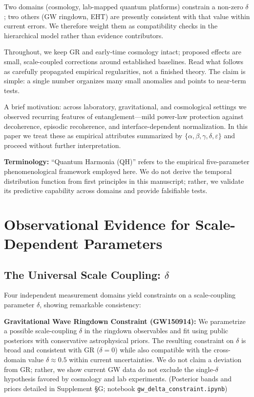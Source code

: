 Two domains (cosmology, lab-mapped quantum platforms) constrain a non-zero $\delta$; two others (GW ringdown, EHT) are presently consistent with that value within current errors. We therefore weight them as compatibility checks in the hierarchical model rather than evidence contributors.

Throughout, we keep GR and early-time cosmology intact; proposed effects are small, scale-coupled corrections around established baselines. Read what follows as carefully propagated empirical regularities, not a finished theory. The claim is simple: a single number organizes many small anomalies and points to near-term tests.

A brief motivation: across laboratory, gravitational, and cosmological settings we observed recurring features of entanglement---mild power-law protection against decoherence, episodic recoherence, and interface-dependent normalization. In this paper we treat these as empirical attributes summarized by $\{\alpha, \beta, \gamma, \delta, \varepsilon\}$ and proceed without further interpretation.

\textbf{Terminology:} ``Quantum Harmonia (QH)'' refers to the empirical five-parameter phenomenological framework employed here. We do not derive the temporal distribution function from first principles in this manuscript; rather, we validate its predictive capability across domains and provide falsifiable tests.

\section{Observational Evidence for Scale-Dependent Parameters}

\subsection{The Universal Scale Coupling: $\delta$}

Four independent measurement domains yield constraints on a scale-coupling parameter $\delta$, showing remarkable consistency:

\textbf{Gravitational Wave Ringdown Constraint (GW150914):}
We parametrize a possible scale-coupling $\delta$ in the ringdown observables and fit using public posteriors with conservative astrophysical priors. The resulting constraint on $\delta$ is broad and consistent with GR ($\delta = 0$) while also compatible with the cross-domain value $\delta \approx 0.5$ within current uncertainties. We do not claim a deviation from GR; rather, we show current GW data do not exclude the single-$\delta$ hypothesis favored by cosmology and lab experiments.
(Posterior bands and priors detailed in Supplement \S G; notebook \texttt{gw\_delta\_constraint.ipynb})

